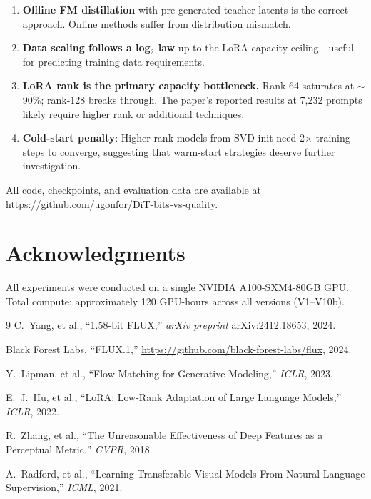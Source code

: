 \documentclass[10pt,twocolumn]{article}
\begin{document}
\begin{enumerate}[nosep,leftmargin=*]
  \item \textbf{Offline FM distillation} with pre-generated teacher latents is the correct approach. Online methods suffer from distribution mismatch.
  \item \textbf{Data scaling follows a log$_2$ law} up to the LoRA capacity ceiling---useful for predicting training data requirements.
  \item \textbf{LoRA rank is the primary capacity bottleneck.} Rank-64 saturates at $\sim$90\%; rank-128 breaks through. The paper's reported results at 7{,}232 prompts likely require higher rank or additional techniques.
  \item \textbf{Cold-start penalty}: Higher-rank models from SVD init need 2$\times$ training steps to converge, suggesting that warm-start strategies deserve further investigation.
\end{enumerate}

All code, checkpoints, and evaluation data are available at \url{https://github.com/ugonfor/DiT-bits-vs-quality}.

\section*{Acknowledgments}
All experiments were conducted on a single NVIDIA A100-SXM4-80GB GPU.
Total compute: approximately 120 GPU-hours across all versions (V1--V10b).

\begin{thebibliography}{9}
C.~Yang, et al., ``1.58-bit FLUX,'' \textit{arXiv preprint} arXiv:2412.18653, 2024.

Black Forest Labs, ``FLUX.1,'' \url{https://github.com/black-forest-labs/flux}, 2024.

Y.~Lipman, et al., ``Flow Matching for Generative Modeling,'' \textit{ICLR}, 2023.

E.~J.~Hu, et al., ``LoRA: Low-Rank Adaptation of Large Language Models,'' \textit{ICLR}, 2022.

R.~Zhang, et al., ``The Unreasonable Effectiveness of Deep Features as a Perceptual Metric,'' \textit{CVPR}, 2018.

A.~Radford, et al., ``Learning Transferable Visual Models From Natural Language Supervision,'' \textit{ICML}, 2021.
\end{thebibliography}
\end{document}
